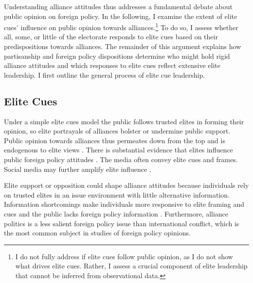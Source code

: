 \documentclass[12pt]{article}
\begin{document}


Understanding alliance attitudes thus addresses a fundamental debate about public opinion on foreign policy. 
In the following, I examine the extent of elite cues' influence on public opinion towards alliances.\footnote{I do not fully address if elite cues follow public opinion, as I do not show what drives elite cues. Rather, I assess a crucial component of elite leadership that cannot be inferred from observational data.}
To do so, I assess whether all, some, or little of the electorate responds to elite cues based on their predispositions towards alliances.
The remainder of this argument explains how partisanship and foreign policy dispositions determine who might hold rigid alliance attitudes and which responses to elite cues reflect extensive elite leadership. 
I first outline the general process of elite cue leadership. 


\subsection{Elite Cues} 


Under a simple elite cues model the public follows trusted elites in forming their opinion, so elite portrayals of alliances bolster or undermine public support.
Public opinion towards alliances thus permeates down from the top and is endogenous to elite views \citep{Druckman2014}.
There is substantial evidence that elites influence public foreign policy attitudes \citep{BaumPotter2008}. 
The media often convey elite cues and frames.
Social media may further amplify elite influence \citep{BaumPotter2019}.   


Elite support or opposition could shape alliance attitudes because individuals rely on trusted elites in an issue environment with little alternative information. 
Information shortcomings make individuals more responsive to elite framing and cues \citep{Druckman2001, Peterson2017} and the public lacks foreign policy information \citep{BaumPotter2008}.
Furthermore, alliance politics is a less salient foreign policy issue than international conflict, which is the most common subject in studies of foreign policy opinions. 
\end{document}
